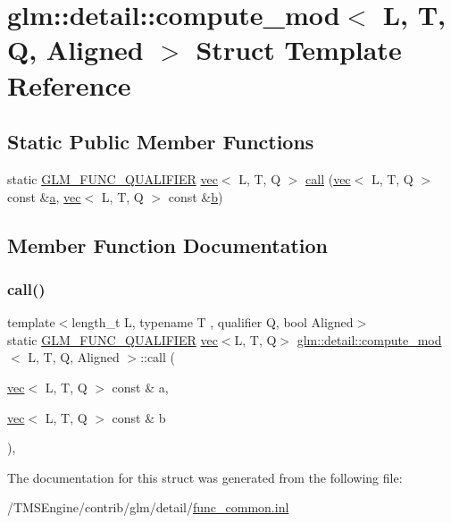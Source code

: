 \hypertarget{structglm_1_1detail_1_1compute__mod}{}\section{glm\+:\+:detail\+:\+:compute\+\_\+mod$<$ L, T, Q, Aligned $>$ Struct Template Reference}
\label{structglm_1_1detail_1_1compute__mod}
\subsection*{Static Public Member Functions}
\begin{DoxyCompactItemize}
\item 
static \hyperlink{setup_8hpp_a33fdea6f91c5f834105f7415e2a64407}{G\+L\+M\+\_\+\+F\+U\+N\+C\+\_\+\+Q\+U\+A\+L\+I\+F\+I\+ER} \hyperlink{structglm_1_1vec}{vec}$<$ L, T, Q $>$ \hyperlink{structglm_1_1detail_1_1compute__mod_a91bba836ba6e6148d3626aad034a01aa}{call} (\hyperlink{structglm_1_1vec}{vec}$<$ L, T, Q $>$ const \&\hyperlink{_s_d_l__opengl__glext_8h_a3309789fc188587d666cda5ece79cf82}{a}, \hyperlink{structglm_1_1vec}{vec}$<$ L, T, Q $>$ const \&\hyperlink{_s_d_l__opengl__glext_8h_a0f71581a41fd2264c8944126dabbd010}{b})
\end{DoxyCompactItemize}


\subsection{Member Function Documentation}
\mbox{\label{structglm_1_1detail_1_1compute__mod_a91bba836ba6e6148d3626aad034a01aa}} 
\subsubsection{\texorpdfstring{call()}{call()}}
{\footnotesize\ttfamily template$<$length\+\_\+t L, typename T , qualifier Q, bool Aligned$>$ \\
static \hyperlink{setup_8hpp_a33fdea6f91c5f834105f7415e2a64407}{G\+L\+M\+\_\+\+F\+U\+N\+C\+\_\+\+Q\+U\+A\+L\+I\+F\+I\+ER} \hyperlink{structglm_1_1vec}{vec}$<$L, T, Q$>$ \hyperlink{structglm_1_1detail_1_1compute__mod}{glm\+::detail\+::compute\+\_\+mod}$<$ L, T, Q, Aligned $>$\+::call (\begin{DoxyParamCaption}\item[{\hyperlink{structglm_1_1vec}{vec}$<$ L, T, Q $>$ const \&}]{a,  }\item[{\hyperlink{structglm_1_1vec}{vec}$<$ L, T, Q $>$ const \&}]{b }\end{DoxyParamCaption})\hspace{0.3cm}{\ttfamily [inline]}, {\ttfamily [static]}}



The documentation for this struct was generated from the following file\+:\begin{DoxyCompactItemize}
\item 
/\+T\+M\+S\+Engine/contrib/glm/detail/\hyperlink{func__common_8inl}{func\+\_\+common.\+inl}\end{DoxyCompactItemize}
